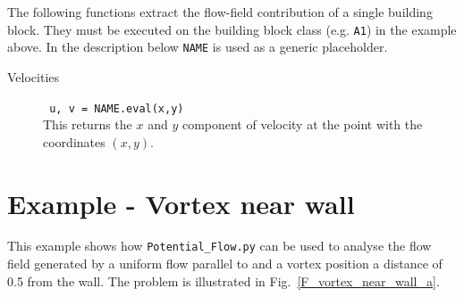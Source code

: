 \documentclass[10pt,a4paper]{article}
\begin{document}
The following functions extract the flow-field contribution of a single building block. 
They must be executed on the building block class (e.g. \verb'A1') in the example above. 
In the description below \verb'NAME' is used as a generic placeholder.   
\begin{description}
\item[Velocities] \verb' u, v = NAME.eval(x,y)' \\
This returns the $x$ and $y$ component of velocity at the point with the coordinates $(x, y)$.
\end{description}


\clearpage
\section{Example - Vortex near wall}
This example shows how \verb'Potential_Flow.py' can be used to analyse the flow field generated by a uniform flow parallel to and a vortex position a distance of \num{0.5} from the wall. 
The problem is illustrated in Fig.~\ref{F_vortex_near_wall_a}.
\end{document}
